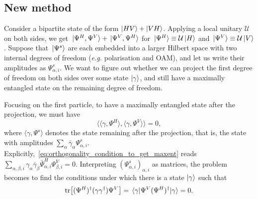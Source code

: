 \documentclass[
	aps, pra, authorblock, superscriptaddress, twocolumn,
	10pt
]{revtex4-1}
\newcommand{\calU}{{\mathcal{U}}}
\begin{document}
\subsection{New method}
Consider a bipartite state of the form $\ket{HV}+\ket{VH}$.
Applying a local unitary $\calU$ on both sides, we get
$\ket*{\Psi^H,\Psi^V} + \ket*{\Psi^V,\Psi^H}$
for $\ket*{\Psi^H}\equiv \calU \ket H$
and $\ket*{\Psi^V}\equiv \calU \ket V$.
    Suppose that $\ket*{\Psi^s}$ are each embedded into a larger Hilbert space with two internal degrees of freedom (\emph{e.g.} polarisation and OAM), and let us write their amplitudes as $\Psi^s_{\alpha,i}$. We want to figure out whether we can project the first degree of freedom on both sides over some state $\ket\gamma$, and still have a maximally entangled state on the remaining degree of freedom.

Focusing on the first particle, to have a maximally entangled state after the projection, we must have
\begin{equation}
    \langle \langle \gamma, \Psi^H\rangle, \langle \gamma, \Psi^V\rangle\rangle=0,
    \label{eq:orthogonality_condition_to_get_maxent}
\end{equation}
where $\langle \gamma,\Psi^s\rangle$ denotes the state remaining after the projection, that is, the state with amplitudes $\sum_\alpha \bar\gamma_\alpha\Psi^s_{\alpha,i}$.
Explicitly,~\cref{eq:orthogonality_condition_to_get_maxent} reads
$%
    \sum_{\alpha,\beta,i}
    \gamma_\alpha \bar\gamma_\beta \bar\Psi^H_{\alpha,i} \Psi^V_{\beta,i} = 0.
$ %
Interpreting $(\Psi^s_{\alpha,i})_{\alpha,i}$ as matrices, the problem becomes to find the conditions under which there is a state $\ket\gamma$ such that
\begin{equation}
    \tr[
        (\Psi^H)^\dagger (\gamma\gamma^\dagger) \Psi^V
    ] =
    \mel{\gamma}{\Psi^V(\Psi^H)^\dagger}{\gamma} = 0.
    \label{eq:expval0_condition}
\end{equation}
\end{document}
